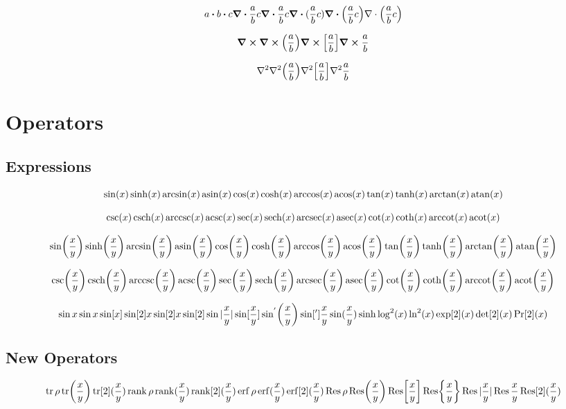 \documentclass{article}
\begin{document}
\[
  a\dotproduct b \vdot c
  \divergence{\frac{a}{b}c}
  \div{\frac{a}{b}c}
  \div{(\frac{a}{b}c)}
  \div(\frac{a}{b}c)
  {\bf\nabla} \cdot \left(\frac{a}{b}c\right)
\]

\[
  \curl 
  \curl(\frac{a}{b})
  \curl[\frac{a}{b}]
  \curl{\frac{a}{b}}
\]

\[
  \laplacian 
  \laplacian(\frac{a}{b})
  \laplacian[\frac{a}{b}]
  \laplacian{\frac{a}{b}}
\]

\newpage

\section*{Operators}

\subsection*{Expressions}
\[
  \sin(x)
  \sinh(x)
  \arcsin(x)
  \asin(x)
  \cos(x)
  \cosh(x)
  \arccos(x)
  \acos(x)
  \tan(x)
  \tanh(x)
  \arctan(x)
  \atan(x)
\]

\[
  \csc(x)
  \csch(x)
  \arccsc(x)
  \acsc(x)
  \sec(x)
  \sech(x)
  \arcsec(x)
  \asec(x)
  \cot(x)
  \coth(x)
  \arccot(x)
  \acot(x)
\]

\[
  \sin(\frac{x}{y})
  \sinh(\frac{x}{y})
  \arcsin(\frac{x}{y})
  \asin(\frac{x}{y})
  \cos(\frac{x}{y})
  \cosh(\frac{x}{y})
  \arccos(\frac{x}{y})
  \acos(\frac{x}{y})
  \tan(\frac{x}{y})
  \tanh(\frac{x}{y})
  \arctan(\frac{x}{y})
  \atan(\frac{x}{y})
\]

\[
  \csc(\frac{x}{y})
  \csch(\frac{x}{y})
  \arccsc(\frac{x}{y})
  \acsc(\frac{x}{y})
  \sec(\frac{x}{y})
  \sech(\frac{x}{y})
  \arcsec(\frac{x}{y})
  \asec(\frac{x}{y})
  \cot(\frac{x}{y})
  \coth(\frac{x}{y})
  \arccot(\frac{x}{y})
  \acot(\frac{x}{y})
\]


\[
  \sin x
  \sin{x}
  \sin[x]
  \sin[2]{x}
  \sin[2]x
  \sin[2]
  \sin|\frac{x}{y}|
  \sin[\frac{x}{y}]
  \sin['](\frac{x}{y})
  \sin[']{\frac{x}{y}}
  \sine(\frac{x}{y})
  \hypsine
  \log[2](x)
  \ln[2](x)
  \exp[2](x)
  \det[2](x)
  \Pr[2](x)
\]

\newpage
\subsection*{New Operators}

\[
  \tr\rho
  \tr(\frac{x}{y})
  \tr[2](\frac{x}{y})
  \rank\rho
  \rank(\frac{x}{y})
  \rank[2](\frac{x}{y})
  \erf\rho
  \erf(\frac{x}{y})
  \erf[2](\frac{x}{y})
  \Res\rho
  \Res(\frac{x}{y})
  \Res[\frac{x}{y}]
  \Res{\frac{x}{y}}
  \Res|\frac{x}{y}|
  \Res \frac{x}{y}
  \Res[2](\frac{x}{y})
\]
\end{document}
